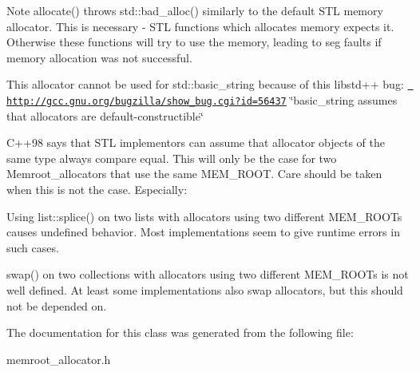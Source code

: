 \begin{DoxyNote}{Note}
allocate() throws std\+::bad\+\_\+alloc() similarly to the default S\+TL memory allocator. This is necessary -\/ S\+TL functions which allocates memory expects it. Otherwise these functions will try to use the memory, leading to seg faults if memory allocation was not successful.

This allocator cannot be used for std\+::basic\+\_\+string because of this libstd++ bug\+: \href{http://gcc.gnu.org/bugzilla/show_bug.cgi?id=56437}\texttt{ http\+://gcc.\+gnu.\+org/bugzilla/show\+\_\+bug.\+cgi?id=56437} \char`\"{}basic\+\_\+string assumes that allocators are default-\/constructible\char`\"{}

C++98 says that S\+TL implementors can assume that allocator objects of the same type always compare equal. This will only be the case for two Memroot\+\_\+allocators that use the same M\+E\+M\+\_\+\+R\+O\+OT. Care should be taken when this is not the case. Especially\+:
\begin{DoxyItemize}
\item Using list\+::splice() on two lists with allocators using two different M\+E\+M\+\_\+\+R\+O\+O\+Ts causes undefined behavior. Most implementations seem to give runtime errors in such cases.
\item swap() on two collections with allocators using two different M\+E\+M\+\_\+\+R\+O\+O\+Ts is not well defined. At least some implementations also swap allocators, but this should not be depended on. 
\end{DoxyItemize}
\end{DoxyNote}


The documentation for this class was generated from the following file\+:\begin{DoxyCompactItemize}
\item 
memroot\+\_\+allocator.\+h\end{DoxyCompactItemize}
